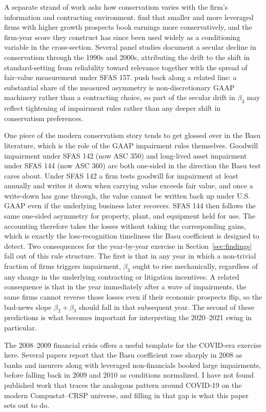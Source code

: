 \documentclass[12pt]{article}
\begin{document}
A separate strand of work asks how conservatism varies with the firm's information and contracting environment. \citet{khan2009} find that smaller and more leveraged firms with higher growth prospects book earnings more conservatively, and the firm-year score they construct has since been used widely as a conditioning variable in the cross-section. Several panel studies document a secular decline in conservatism through the 1990s and 2000s, attributing the drift to the shift in standard-setting from reliability toward relevance together with the spread of fair-value measurement under SFAS 157. \citet{lawrence2013} push back along a related line: a substantial share of the measured asymmetry is non-discretionary GAAP machinery rather than a contracting choice, so part of the secular drift in $\beta_3$ may reflect tightening of impairment rules rather than any deeper shift in conservatism preferences.

One piece of the modern conservatism story tends to get glossed over in the Basu literature, which is the role of the GAAP impairment rules themselves. Goodwill impairment under SFAS 142 (now ASC 350) and long-lived asset impairment under SFAS 144 (now ASC 360) are both one-sided in the direction the Basu test cares about. Under SFAS 142 a firm tests goodwill for impairment at least annually and writes it down when carrying value exceeds fair value, and once a write-down has gone through, the value cannot be written back up under U.S. GAAP even if the underlying business later recovers. SFAS 144 then follows the same one-sided asymmetry for property, plant, and equipment held for use. The accounting therefore takes the losses without taking the corresponding gains, which is exactly the loss-recognition timeliness the Basu coefficient is designed to detect. Two consequences for the year-by-year exercise in Section~\ref{sec:findings} fall out of this rule structure. The first is that in any year in which a non-trivial fraction of firms triggers impairment, $\beta_3$ ought to rise mechanically, regardless of any change in the underlying contracting or litigation incentives. A related consequence is that in the year immediately after a wave of impairments, the same firms cannot reverse those losses even if their economic prospects flip, so the bad-news slope $\beta_2 + \beta_3$ should fall in that subsequent year. The second of these predictions is what becomes important for interpreting the 2020--2021 swing in particular.

The 2008--2009 financial crisis offers a useful template for the COVID-era exercise here. Several papers report that the Basu coefficient rose sharply in 2008 as banks and insurers along with leveraged non-financials booked large impairments, before falling back in 2009 and 2010 as conditions normalized. I have not found published work that traces the analogous pattern around COVID-19 on the modern Compustat--CRSP universe, and filling in that gap is what this paper sets out to do.
\end{document}
